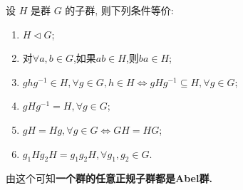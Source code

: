 \documentclass[../../main.tex]{subfiles}%
\begin{document}
\begin{theorem}\label{theorem:抽象代数-定理 1.3.5}
设 \( H \) 是群 \( G \) 的子群, 则下列条件等价:
\begin{enumerate}[(1)]
\item\label{theorem:抽象代数-定理 1.3.5-1} \( H \lhd  G \);

\item\label{theorem:抽象代数-定理 1.3.5-3} 对$\forall a,b\in G$,如果$ab\in H$,则$ba\in H$;

\item\label{theorem:抽象代数-定理 1.3.5-2} $g h g^{-1} \in H,\forall g \in G, h \in H\iff gHg^{-1}\subseteq H,\forall g\in G$;

\item\label{theorem:抽象代数-定理 1.3.5-4} \( gHg^{-1} = H, \forall g \in G \);

\item\label{theorem:抽象代数-定理 1.3.5-5} \( gH = Hg, \forall g \in G \iff GH=HG\);

\item\label{theorem:抽象代数-定理 1.3.5-6} \( g_1Hg_2H = g_1g_2H, \forall g_1, g_2 \in G \).
\end{enumerate}
\end{theorem}
\begin{remark}
由这个可知\textbf{一个群的任意正规子群都是Abel群.}
\end{remark}
\end{document}
